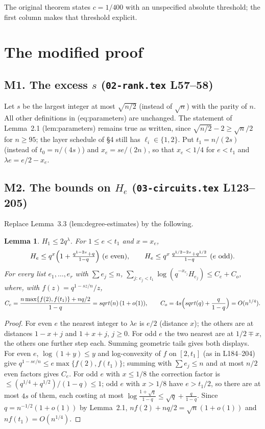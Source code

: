 \documentclass[10pt]{amsart}
\newtheorem{lemma}[theorem]{Lemma}
\theoremstyle{remark}
\begin{document}
The original theorem states $c=1/400$ with an unspecified absolute threshold; the
first column makes that threshold explicit.

\section{The modified proof}

\subsection*{M1. The excess $s$ (\texttt{02-rank.tex} L57--58)}
Let $s$ be the largest integer at most $\sqrt{n/2}$ (instead of $\sqrt n$) with the parity
of $n$. All other definitions in (eq:parameters) are unchanged. The statement of
Lemma~2.1 (lem:parameters) remains true as written, since
$\sqrt{n/2}-2\ge\sqrt n/2$ for $n\ge 95$; the layer schedule of \S4 still has
$\ell_i\in\{1,2\}$. Put $t_1=n/(2s)$ (instead of $t_0=n/(4s)$) and $x_e=se/(2n)$, so that
$x_e<1/4$ for $e<t_1$ and $\lambda e=e/2-x_e$.

\subsection*{M2. The bounds on $H_e$ (\texttt{03-circuits.tex} L123--205)}
Replace Lemma~3.3 (lem:degree-estimates) by the following.
\begin{lemma}\label{lem:H}
$H_1\le 2q^{\lambda}$. For $1\le e<t_1$ and $x=x_e$,
\[
H_e\le q^{x}\Bigl(1+\tfrac{q^{1-2x}+q}{1-q}\Bigr)\ (e\text{ even}),\qquad
H_e\le q^{x}\,\tfrac{q^{1/2-2x}+q^{1/2}}{1-q}\ (e\text{ odd}).
\]
For every list $e_1,\ldots,e_r$ with $\sum e_j\le n$,
$\sum_{j:\,e_j<t_1}\log(q^{-x_{e_j}}H_{e_j})\le C_e+C_o$, where, with $f(z)=q^{1-sz/n}/z$,
\[
C_e=\frac{n\max\{f(2),f(t_1)\}+nq/2}{1-q}=\sqrt n\,(1+o(1)),\qquad
C_o=4s\Bigl(\sqrt q+\frac{q}{1-q}\Bigr)=O(n^{1/4}).
\]
\end{lemma}
\begin{proof}
For even $e$ the nearest integer to $\lambda e$ is $e/2$ (distance $x$); the others are at
distances $1-x+j$ and $1+x+j$, $j\ge0$. For odd $e$ the two nearest are at $1/2\mp x$, the
others one further step each. Summing geometric tails gives both displays. For even $e$,
$\log(1+y)\le y$ and log-convexity of $f$ on $[2,t_1]$ (as in L184--204) give
$q^{1-se/n}\le e\max\{f(2),f(t_1)\}$; summing with $\sum e_j\le n$ and at most $n/2$ even
factors gives $C_e$. For odd $e$ with $x\le1/8$ the correction factor is
$\le(q^{1/4}+q^{1/2})/(1-q)\le1$; odd $e$ with $x>1/8$ have $e>t_1/2$, so there are at most
$4s$ of them, each costing at most $\log\frac{1+\sqrt q}{1-q}\le\sqrt q+\frac q{1-q}$.
Since $q=n^{-1/2}(1+o(1))$ by Lemma~2.1, $n f(2)+nq/2=\sqrt n(1+o(1))$ and $nf(t_1)=O(n^{1/4})$.
\end{proof}
\end{document}
